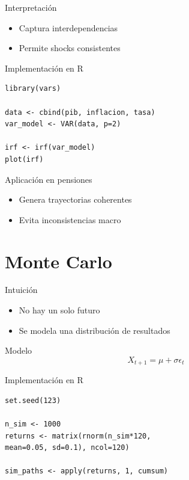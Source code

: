 \documentclass{beamer}
\begin{document}
\begin{frame}{Interpretación}
\begin{itemize}
\item Captura interdependencias
\item Permite shocks consistentes
\end{itemize}
\end{frame}

\begin{frame}[fragile]{Implementación en R}
\begin{verbatim}
library(vars)

data <- cbind(pib, inflacion, tasa)
var_model <- VAR(data, p=2)

irf <- irf(var_model)
plot(irf)
\end{verbatim}
\end{frame}

\begin{frame}{Aplicación en pensiones}
\begin{itemize}
\item Genera trayectorias coherentes
\item Evita inconsistencias macro
\end{itemize}
\end{frame}

\section{Monte Carlo}

\begin{frame}{Intuición}
\begin{itemize}
\item No hay un solo futuro
\item Se modela una distribución de resultados
\end{itemize}
\end{frame}

\begin{frame}{Modelo}
\[
X_{t+1} = \mu + \sigma \epsilon_t
\]
\end{frame}

\begin{frame}[fragile]{Implementación en R}
\begin{verbatim}
set.seed(123)

n_sim <- 1000
returns <- matrix(rnorm(n_sim*120, 
mean=0.05, sd=0.1), ncol=120)

sim_paths <- apply(returns, 1, cumsum)
\end{verbatim}
\end{frame}
\end{document}
